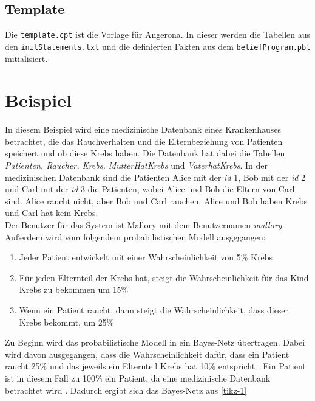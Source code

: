\documentclass[german,version-2020-11]{uzl-thesis}
\begin{document}
\subsection{Template}
Die \texttt{template.cpt} ist die Vorlage für Angerona. In dieser werden die Tabellen aus den \texttt{initStatements.txt} und die definierten Fakten aus dem \texttt{beliefProgram.pbl} initialisiert.

\section{Beispiel} \label{chap:Beispiel}
In diesem Beispiel wird  eine medizinische Datenbank eines Krankenhauses betrachtet, die das Rauchverhalten und die Elternbeziehung von Patienten speichert und ob diese Krebs haben. Die Datenbank hat dabei die Tabellen \textit{Patienten, Raucher, Krebs, MutterHatKrebs } und \textit{VaterhatKrebs}. In der medizinischen Datenbank sind die Patienten Alice mit der \textit{id} 1, Bob mit der \textit{id} 2 und Carl mit der \textit{id} 3 die Patienten, wobei Alice und Bob die Eltern von Carl sind. Alice raucht nicht, aber Bob und Carl rauchen. Alice und Bob haben Krebs und Carl hat kein Krebs.\\  Der Benutzer für das System ist Mallory mit dem Benutzernamen \textit{mallory}. Außerdem wird vom folgendem probabilistischen Modell ausgegangen: 
\begin{enumerate}
\item Jeder Patient entwickelt mit einer Wahrscheinlichkeit von 5\% Krebs
\item Für jeden Elternteil der Krebs hat, steigt die Wahrscheinlichkeit für das Kind Krebs zu bekommen um 15\%
\item Wenn ein Patient raucht, dann steigt die Wahrscheinlichkeit, dass dieser Krebs bekommt, um  25\%
\end{enumerate}
Zu Beginn  wird das probabilistische Modell in ein Bayes-Netz übertragen. Dabei wird davon ausgegangen, dass die Wahrscheinlichkeit dafür, dass ein Patient raucht 25\% und das jeweils ein Elternteil Krebs hat 10\% entspricht \cite{11}. Ein Patient ist in diesem Fall zu 100\% ein Patient, da eine medizinische Datenbank betrachtet wird \cite{guarnieri2017securing}. Dadurch ergibt sich das Bayes-Netz aus \autoref{tikz-1} \\
\end{document}
